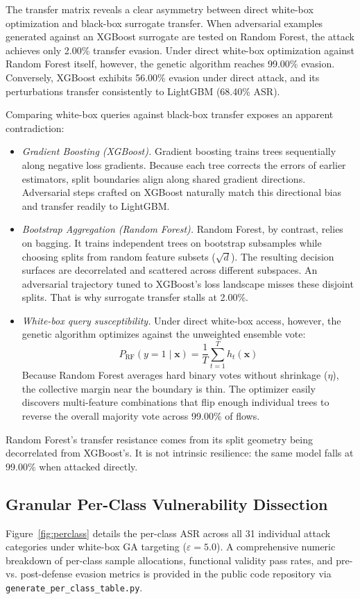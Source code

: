 \documentclass[iicol,pdflatex,sn-mathphys-num]{sn-jnl}
\begin{document}
The transfer matrix reveals a clear asymmetry between direct white-box optimization and black-box surrogate transfer. When adversarial examples generated against an XGBoost surrogate are tested on Random Forest, the attack achieves only 2.00\% transfer evasion. Under direct white-box optimization against Random Forest itself, however, the genetic algorithm reaches 99.00\% evasion. Conversely, XGBoost exhibits 56.00\% evasion under direct attack, and its perturbations transfer consistently to LightGBM (68.40\% ASR).

Comparing white-box queries against black-box transfer exposes an apparent contradiction:
\begin{itemize}
    \item \textit{Gradient Boosting (XGBoost).} Gradient boosting trains trees sequentially along negative loss gradients. Because each tree corrects the errors of earlier estimators, split boundaries align along shared gradient directions. Adversarial steps crafted on XGBoost naturally match this directional bias and transfer readily to LightGBM.
    \item \textit{Bootstrap Aggregation (Random Forest).} Random Forest, by contrast, relies on bagging. It trains independent trees on bootstrap subsamples while choosing splits from random feature subsets ($\sqrt{d}$). The resulting decision surfaces are decorrelated and scattered across different subspaces. An adversarial trajectory tuned to XGBoost's loss landscape misses these disjoint splits. That is why surrogate transfer stalls at 2.00\%.
    \item \textit{White-box query susceptibility.} Under direct white-box access, however, the genetic algorithm optimizes against the unweighted ensemble vote:
    \begin{equation}
        P_{\text{RF}}(y=1 \mid \mathbf{x}) = \frac{1}{T} \sum_{t=1}^T h_t(\mathbf{x})
    \end{equation}
    Because Random Forest averages hard binary votes without shrinkage ($\eta$), the collective margin near the boundary is thin. The optimizer easily discovers multi-feature combinations that flip enough individual trees to reverse the overall majority vote across 99.00\% of flows.
\end{itemize}
Random Forest's transfer resistance comes from its split geometry being decorrelated from XGBoost's. It is not intrinsic resilience: the same model falls at 99.00\% when attacked directly.

\subsection{Granular Per-Class Vulnerability Dissection}
Figure~\ref{fig:perclass} details the per-class ASR across all 31 individual attack categories under white-box GA targeting ($\varepsilon = 5.0$). A comprehensive numeric breakdown of per-class sample allocations, functional validity pass rates, and pre- vs. post-defense evasion metrics is provided in the public code repository via \texttt{generate\_per\_class\_table.py}. 
\end{document}
